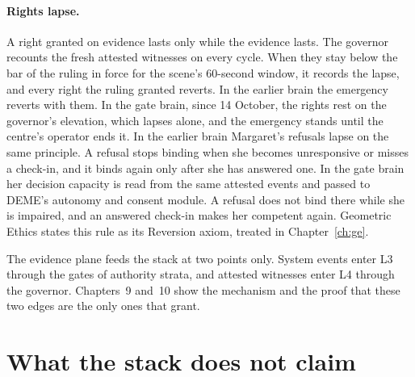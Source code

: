 \paragraph{Rights lapse.} A right granted on evidence lasts only while the evidence lasts. The
governor recounts the fresh attested witnesses on every cycle. When they stay below the bar of
the ruling in force for the scene's 60-second window, it records the lapse, and every right the
ruling granted reverts.
In the earlier brain the emergency reverts with them. In the gate brain, since 14 October, the
rights rest on the governor's elevation, which lapses alone, and the emergency stands until the
centre's operator ends it.
In the earlier brain Margaret's refusals lapse on the same principle. A refusal stops binding when
she becomes unresponsive or misses a check-in, and it binds again only after she has answered one.
In the gate brain her decision capacity is read from the same attested events and passed to
DEME's autonomy and consent module. A refusal does not bind there while she is impaired, and an
answered check-in makes her competent again.
Geometric Ethics states this rule as its Reversion axiom, treated in Chapter~\ref{ch:ge}.

The evidence plane feeds the stack at two points only. System events enter L3 through the gates of
authority strata, and attested witnesses enter L4 through the governor. Chapters~9 and~10 show the
mechanism and the proof that these two edges are the only ones that grant.

\section{What the stack does not claim}\label{sec:pe-limits}

